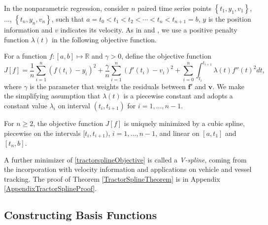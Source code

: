 In the nonparametric regression, consider $n$ paired time series points $\left\lbrace t_1,y_1,v_1\right\rbrace$, $\ldots$, $\left\lbrace t_n,y_n,v_n\right\rbrace$, such that $a =t_0< t_1<t_2< \cdots < t_n <t_{n+1} = b$, $y$ is the position information and $v$ indicates its velocity. As in \citep{silverman1985some} and \citep{donoho1995wavelet}, we use a positive penalty function $\lambda(t)$ in the following objective function. 

For a function $f:[a,b]\mapsto \mathbb{R}$ and $\gamma>0$, define the objective function 
\begin{equation}\label{tractorsplineObjective}
J[f]= \frac{1}{n} \sum_{i=1}^{n} \left( f(t_i)-y_i \right)^2 + \frac{\gamma}{n} \sum_{i=1}^{n} \left( f'(t_i)-v_i \right)^2 +\sum_{i=0}^{n} \int_{t_i}^{t_{i+1}}\lambda(t)  f''(t)^2dt,
\end{equation}
where $\gamma$ is the parameter that weights the residuals between $\mathbf{f}'$ and $\mathbf{v}$. We make the simplifying assumption that $\lambda(t)$ is a piecewise constant and adopts a constant value $\lambda_i$ on interval $(t_i,t_{i+1})$ for $i=1,\ldots, n-1$. 

\begin{theorem}\label{TractorSplineTheorem}
For $n\geq2$, the objective function $J[f]$ is uniquely minimized by a cubic spline, piecewise on the intervals $[t_i,t_{i+1})$, $i=1,\ldots,n-1$,  and linear on $[a,t_1]$ and $[t_n,b]$.
\end{theorem}
A further minimizer of \eqref{tractorsplineObjective} is called a \textit{V-spline}, coming from the incorporation with velocity information and applications on vehicle and vessel tracking. The proof of Theorem \ref{TractorSplineTheorem} is in Appendix \ref{AppendixTractorSplineProof}. 



\subsection{Constructing Basis Functions}

